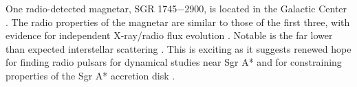 
One radio-detected magnetar, 
SGR 1745$-$2900, is located in the Galactic Center \citep{mgz+13,kbk+13,sj13,efk+13}.
The radio properties of the magnetar are similar to those of the first three, 
with evidence for independent X-ray/radio flux evolution \citep{laks15,tek+15}. 
Notable is the far lower than expected interstellar scattering
\citep{sle+14,bdd+14}.  
This is exciting as it suggests renewed hope for finding
radio pulsars for dynamical studies near Sgr A* and for constraining properties
of the Sgr A* accretion disk \citep{efk+13}.




